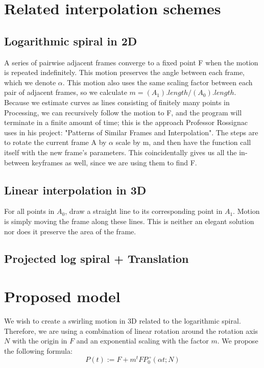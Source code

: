 \documentclass[journal, letterpaper]{IEEEtran}
\begin{document}
\section{Related interpolation schemes}

\subsection{Logarithmic spiral in 2D}
A series of pairwise adjacent frames converge to a fixed point F when the motion is repeated indefinitely.  This motion preserves the angle between each frame, which we denote $\alpha$.  This motion also uses the same scaling factor between each pair of adjacent frames, so we calculate $m = (A_1).length / (A_0).length$.  Because we estimate curves as lines consisting of finitely many points in Processing, we can recursively follow the motion to F, and the program will terminate in a finite amount of time; this is the approach Professor Rossignac uses in his project: "Patterns of Similar Frames and Interpolation".  The steps are to rotate the current frame A by $\alpha$ scale by m, and then have the function call itself with the new frame's parameters.  This coincidentally gives us all the in-between keyframes as well, since we are using them to find F. 

\subsection{Linear interpolation in 3D}
For all points in $A_0$, draw a straight line to its corresponding point in $A_1$.  Motion is simply moving the frame along these lines.  This is neither an elegant solution nor does it preserve the area of the frame.

\subsection{Projected log spiral + Translation}


\section{Proposed model}
We wish to create a swirling motion in 3D related to the logarithmic spiral. Therefore, we are using a combination of linear rotation around the rotation axis $N$ with the origin in $F$ and an exponential scaling with the factor $m$. We propose the following formula:
\begin{equation}
 P(t) := F + m^t FP_0 ^{\;\circ} (\alpha t; N)
\label{eq:Interpolation}
\end{equation}
\end{document}
